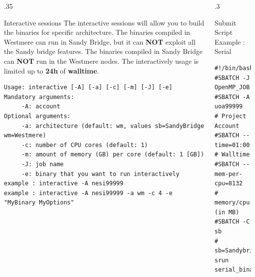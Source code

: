 \documentclass[final,t]{beamer}
\begin{document}
\begin{frame}[fragile]{}
\begin{columns}[t]
\begin{column}{.35\linewidth}
      \begin{block}{Interactive sessions}
      The interactive sessions will allow you to build the binaries for specific architecture. The binaries compiled in Westmere can run in Sandy Bridge, but it can \textbf{NOT} exploit all the Sandy bridge features. The binaries compiled in Sandy Bridge can \textbf{NOT} run in the Westmere nodes. The interactively usage is limited up to \textbf{24h} of \textbf{walltime}.
	 \begin{verbatim}
Usage: interactive [-A] [-a] [-c] [-m] [-J] [-e]
Mandatory arguments:
	 -A: account
Optional arguments:
	 -a: architecture (default: wm, values sb=SandyBridge wm=Westmere)
	 -c: number of CPU cores (default: 1)
	 -m: amount of memory (GB) per core (default: 1 [GB])
	 -J: job name
	 -e: binary that you want to run interactively
example : interactive -A nesi99999
example : interactive -A nesi99999 -a wm -c 4 -e "MyBinary MyOptions"
	\end{verbatim} 
      \end{block}


    \end{column}

    
    \begin{column}{.3\linewidth}
    

      \begin{block}{Submit Script Example : Serial}
              \vspace*{-3ex}
        \begin{verbatim}
#!/bin/bash
#SBATCH -J OpenMP_JOB
#SBATCH -A uoa99999         # Project Account
#SBATCH --time=01:00:00     # Walltime
#SBATCH --mem-per-cpu=8132  # memory/cpu (in MB)
#SBATCH -C sb               # sb=Sandybridge,wm=Westmere
srun serial_binary
        \end{verbatim}
                \vspace*{-4ex}
      \end{block}


\end{column}
\end{columns}
\end{frame}
\end{document}
